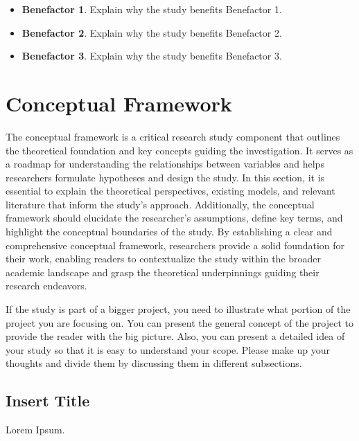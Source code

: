     \begin{itemize}
        \item\textbf{Benefactor 1}.
         Explain why the study benefits Benefactor 1.
         
    	\item\textbf{Benefactor 2}.
         Explain why the study benefits Benefactor 2.
     
    	\item\textbf{Benefactor 3}.
         Explain why the study benefits Benefactor 3.
    \end{itemize}



\section{Conceptual Framework}
    \label{sec:Conceptual Framework}
    
    The conceptual framework is a critical research study component that outlines the theoretical foundation and key concepts guiding the investigation. It serves as a roadmap for understanding the relationships between variables and helps researchers formulate hypotheses and design the study. In this section, it is essential to explain the theoretical perspectives, existing models, and relevant literature that inform the study's approach. Additionally, the conceptual framework should elucidate the researcher's assumptions, define key terms, and highlight the conceptual boundaries of the study. By establishing a clear and comprehensive conceptual framework, researchers provide a solid foundation for their work, enabling readers to contextualize the study within the broader academic landscape and grasp the theoretical underpinnings guiding their research endeavors.

    If the study is part of a bigger project, you need to illustrate what portion of the project you are focusing on. You can present the general concept of the project to provide the reader with the big picture. Also, you can present a detailed idea of your study so that it is easy to understand your scope. Please make up your thoughts and divide them by discussing them in different subsections.

    \subsection{Insert Title}
        Lorem Ipsum.
    
